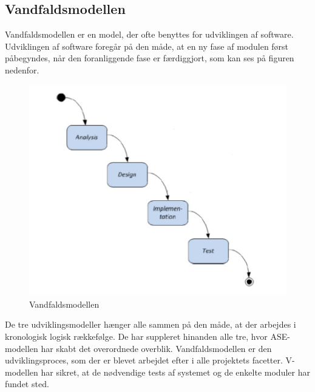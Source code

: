 \subsection{Vandfaldsmodellen}
Vandfaldsmodellen er en model, der ofte benyttes for udviklingen af software. Udviklingen af software foregår på den måde, at en ny fase af modulen først påbegyndes, når den foranliggende fase er færdiggjort, som kan ses på figuren nedenfor. 
\begin{figure}[H]
	\centering
	\includegraphics[width=1\textwidth]{Figurer/vfmodel}
	\caption{Vandfaldsmodellen}
\end{figure}
De tre udviklingsmodeller hænger alle sammen på den måde, at der arbejdes i kronologisk logisk rækkefølge. De har suppleret hinanden alle tre, hvor ASE-modellen har skabt det overordnede overblik. Vandfaldsmodellen er den udviklingsproces, som der er blevet arbejdet efter i alle projektets facetter. V-modellen har sikret, at de nødvendige tests af systemet og de enkelte moduler har fundet sted. 



